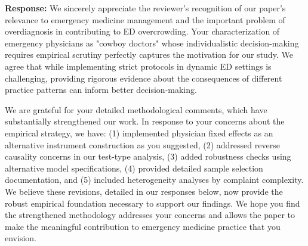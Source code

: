 \documentclass[11pt]{article}
\newcommand{\1}{\hbox{\rm 1\kern-.35em 1}}
\begin{document}
\noindent\textbf{Response:} \color{blue}
We sincerely appreciate the reviewer's recognition of our paper's relevance to emergency medicine management and the important problem of overdiagnosis in contributing to ED overcrowding. Your characterization of emergency physicians as "cowboy doctors" whose individualistic decision-making requires empirical scrutiny perfectly captures the motivation for our study. We agree that while implementing strict protocols in dynamic ED settings is challenging, providing rigorous evidence about the consequences of different practice patterns can inform better decision-making.

We are grateful for your detailed methodological comments, which have substantially strengthened our work. In response to your concerns about the empirical strategy, we have: (1) implemented physician fixed effects as an alternative instrument construction as you suggested, (2) addressed reverse causality concerns in our test-type analysis, (3) added robustness checks using alternative model specifications, (4) provided detailed sample selection documentation, and (5) included heterogeneity analyses by complaint complexity. We believe these revisions, detailed in our responses below, now provide the robust empirical foundation necessary to support our findings. We hope you find the strengthened methodology addresses your concerns and allows the paper to make the meaningful contribution to emergency medicine practice that you envision.
\color{black}

\color{black}
\end{document}
